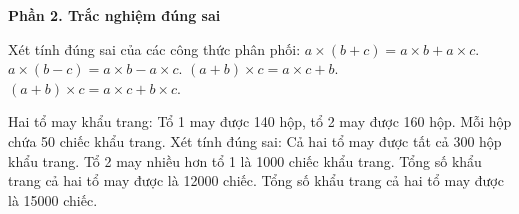 \textbf{Phần 2. Trắc nghiệm đúng sai}

\begin{ex} %
Xét tính đúng sai của các công thức phân phối:
\choiceTF
{\True $a \times (b + c) = a \times b + a \times c$.}
{\True $a \times (b - c) = a \times b - a \times c$.}
{$(a + b) \times c = a \times c + b$.}
{\True $(a + b) \times c = a \times c + b \times c$.}
\end{ex}

\begin{ex} %
Hai tổ may khẩu trang: Tổ 1 may được 140 hộp, tổ 2 may được 160 hộp. Mỗi hộp chứa 50 chiếc khẩu trang. Xét tính đúng sai:
\choiceTF
{\True Cả hai tổ may được tất cả 300 hộp khẩu trang.}
{\True Tổ 2 may nhiều hơn tổ 1 là 1000 chiếc khẩu trang.}
{Tổng số khẩu trang cả hai tổ may được là 12000 chiếc.}
{\True Tổng số khẩu trang cả hai tổ may được là 15000 chiếc.}
\end{ex}

